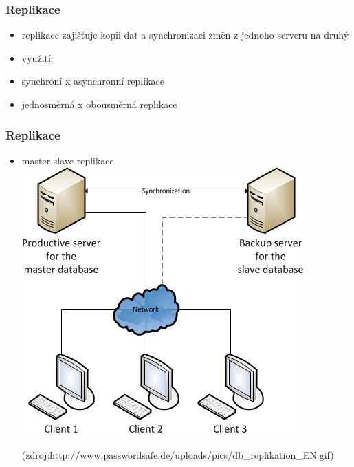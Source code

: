 \documentclass[xcolor=dvipsnames, 14pt]{beamer}
\begin{document}
  \begin{frame}
    \frametitle{Replikace}
    \begin{itemize}
      \item replikace zajišťuje kopii dat a synchronizaci změn z jednoho serveru na druhý
      \item využití:
        \begin{itemize}
        \end{itemize}
      \item synchroní x asynchronní replikace
      \item jednosměrná x obousměrná replikace
    \end{itemize} 
  \end{frame}

  \begin{frame}
    \frametitle{Replikace}
    \begin{itemize}
      \item master-slave replikace
      \\  \includegraphics[scale=0.5]{obr/db_replikation.png} 
      \\  \begin{tiny}(zdroj:http://www.passwordsafe.de/uploads/pics/db\_replikation\_EN.gif)\end{tiny}
    \end{itemize} 
  \end{frame}
\end{document}

